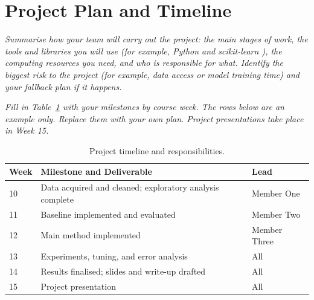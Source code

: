 \documentclass[11pt,a4paper]{article}
\newcommand{\guide}[1]{{\color{gray!85!black}\itshape #1}}
\begin{document}
\section{Project Plan and Timeline}\label{sec:plan}
\guide{Summarise how your team will carry out the project: the main stages of work, the tools and libraries you will use (for example, Python and scikit-learn \cite{pedregosa2011scikit}), the computing resources you need, and who is responsible for what. Identify the biggest risk to the project (for example, data access or model training time) and your fallback plan if it happens.}

\guide{Fill in Table~\ref{tab:timeline} with your milestones by course week. The rows below are an example only. Replace them with your own plan. Project presentations take place in Week 15.}

\begin{table}[h]
  \centering
  \small
  \caption{Project timeline and responsibilities.}
  \label{tab:timeline}
  \begin{tabularx}{\linewidth}{@{}l X l@{}}
    \toprule
    \textbf{Week} & \textbf{Milestone and Deliverable} & \textbf{Lead} \\
    \midrule
    10 & Data acquired and cleaned; exploratory analysis complete & Member One \\
    11 & Baseline implemented and evaluated & Member Two \\
    12 & Main method implemented & Member Three \\
    13 & Experiments, tuning, and error analysis & All \\
    14 & Results finalised; slides and write-up drafted & All \\
    15 & Project presentation & All \\
    \bottomrule
  \end{tabularx}
\end{table}


\clearpage


\end{document}
